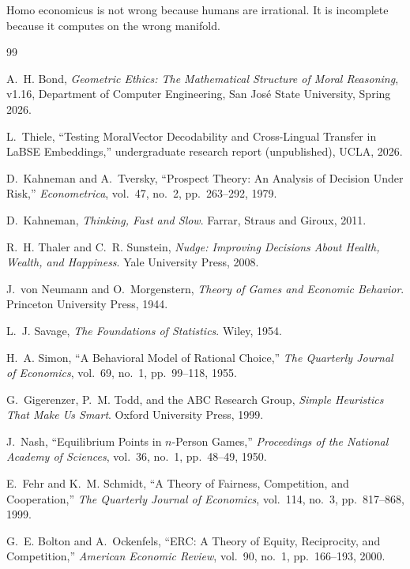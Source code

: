 \documentclass[12pt]{article}
\theoremstyle{definition}
\theoremstyle{remark}
\begin{document}
Homo economicus is not wrong because humans are irrational.  It is incomplete because it computes on the wrong manifold.


\begin{thebibliography}{99}

A.~H. Bond, \emph{Geometric Ethics: The Mathematical Structure of Moral Reasoning}, v1.16, Department of Computer Engineering, San Jos\'{e} State University, Spring 2026.

L.~Thiele, ``Testing MoralVector Decodability and Cross-Lingual Transfer in LaBSE Embeddings,'' undergraduate research report (unpublished), UCLA, 2026.

D.~Kahneman and A.~Tversky, ``Prospect Theory: An Analysis of Decision Under Risk,'' \emph{Econometrica}, vol.~47, no.~2, pp.~263--292, 1979.

D.~Kahneman, \emph{Thinking, Fast and Slow}. Farrar, Straus and Giroux, 2011.

R.~H. Thaler and C.~R. Sunstein, \emph{Nudge: Improving Decisions About Health, Wealth, and Happiness}. Yale University Press, 2008.

J.~von Neumann and O.~Morgenstern, \emph{Theory of Games and Economic Behavior}. Princeton University Press, 1944.

L.~J. Savage, \emph{The Foundations of Statistics}. Wiley, 1954.

H.~A. Simon, ``A Behavioral Model of Rational Choice,'' \emph{The Quarterly Journal of Economics}, vol.~69, no.~1, pp.~99--118, 1955.

G.~Gigerenzer, P.~M. Todd, and the ABC Research Group, \emph{Simple Heuristics That Make Us Smart}. Oxford University Press, 1999.

J.~Nash, ``Equilibrium Points in $n$-Person Games,'' \emph{Proceedings of the National Academy of Sciences}, vol.~36, no.~1, pp.~48--49, 1950.

E.~Fehr and K.~M. Schmidt, ``A Theory of Fairness, Competition, and Cooperation,'' \emph{The Quarterly Journal of Economics}, vol.~114, no.~3, pp.~817--868, 1999.

G.~E. Bolton and A.~Ockenfels, ``ERC: A Theory of Equity, Reciprocity, and Competition,'' \emph{American Economic Review}, vol.~90, no.~1, pp.~166--193, 2000.


\end{thebibliography}
\end{document}
